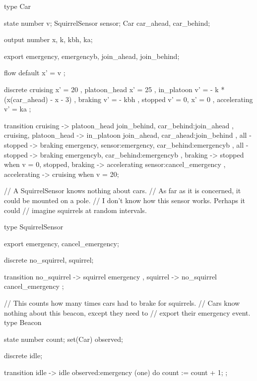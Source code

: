 \begin{vcode}
type Car {
    state
	number v;
	SquirrelSensor sensor;
	Car car_ahead, car_behind;

    output
	number x, k, kbh, ka;

    export emergency, emergencyb, join_ahead, join_behind;

    flow
    	default { x' = v };

    discrete
	cruising		{ x' = 20 },
	platoon_head            { x' = 25 },
	in_platoon              { v' = - k * (x(car_ahead) - x - 3) },
	braking                 { v' = - kbh },
	stopped                 { v' = 0, x' = 0 },
	accelerating            { v' = ka };

    transition
	cruising -> platoon_head { join_behind,
				   car_behind:join_ahead },
	{ cruising, platoon_head } -> in_platoon
			{ join_ahead, car_ahead:join_behind },
	all - {stopped} -> braking { emergency,
				   sensor:emergency,
				   car_behind:emergencyb },
	all - {stopped} ->  braking { emergencyb,
				    car_behind:emergencyb },
	braking -> stopped {} when v = 0,
	{ stopped, braking } -> accelerating
				{ sensor:cancel_emergency },
	accelerating -> cruising {} when v = 20;
}

// A SquirrelSensor knows nothing about cars.
// As far as it is concerned, it could be mounted on a pole.
// I don't know how this sensor works.  Perhaps it could
// imagine squirrels at random intervals.

type SquirrelSensor {
    export emergency, cancel_emergency;

    discrete no_squirrel, squirrel;

    transition
	no_squirrel -> squirrel { emergency },
	squirrel -> no_squirrel { cancel_emergency };
}	

// This counts how many times cars had to brake for squirrels.
// Cars know nothing about this beacon, except they need to
// export their emergency event.
type Beacon {
    state
	number count;
	set(Car) observed;

    discrete idle;

    transition
	idle -> idle { observed:emergency (one) }
		do {count := count + 1; };
}
\end{vcode}

